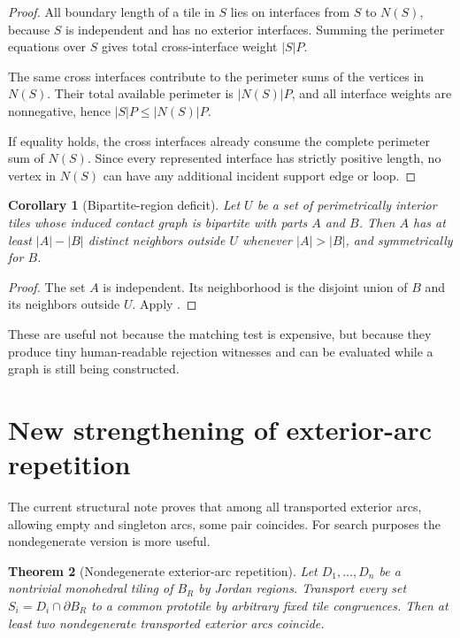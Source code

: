 \documentclass[11pt]{article}
\newtheorem{theorem}{Theorem}[section]
\newtheorem{corollary}[theorem]{Corollary}
\theoremstyle{definition}
\theoremstyle{remark}
\newcommand{\BR}{B_R}
\begin{document}
\begin{proof}
All boundary length of a tile in $S$ lies on interfaces from $S$ to $N(S)$, because $S$ is independent and has no exterior interfaces.  Summing the perimeter equations over $S$ gives total cross-interface weight $|S|P$.

The same cross interfaces contribute to the perimeter sums of the vertices in $N(S)$.  Their total available perimeter is $|N(S)|P$, and all interface weights are nonnegative, hence $|S|P\le |N(S)|P$.

If equality holds, the cross interfaces already consume the complete perimeter sum of $N(S)$.  Since every represented interface has strictly positive length, no vertex in $N(S)$ can have any additional incident support edge or loop.
\end{proof}

\begin{corollary}[Bipartite-region deficit]
Let $U$ be a set of perimetrically interior tiles whose induced contact graph is bipartite with parts $A$ and $B$.  Then $A$ has at least $|A|-|B|$ distinct neighbors outside $U$ whenever $|A|>|B|$, and symmetrically for $B$.
\end{corollary}

\begin{proof}
The set $A$ is independent.  Its neighborhood is the disjoint union of $B$ and its neighbors outside $U$.  Apply .
\end{proof}

These are useful not because the matching test is expensive, but because they produce tiny human-readable rejection witnesses and can be evaluated while a graph is still being constructed.

\section{New strengthening of exterior-arc repetition}
\label{sec:outer-repetition}

The current structural note proves that among all transported exterior arcs, allowing empty and singleton arcs, some pair coincides.  For search purposes the nondegenerate version is more useful.

\begin{theorem}[Nondegenerate exterior-arc repetition]
\label{thm:nondeg-repeat}
Let $D_1,\ldots,D_n$ be a nontrivial monohedral tiling of $\BR$ by Jordan regions.  Transport every set $S_i=D_i\cap\partial\BR$ to a common prototile by arbitrary fixed tile congruences.  Then at least two \emph{nondegenerate} transported exterior arcs coincide.
\end{theorem}
\end{document}
